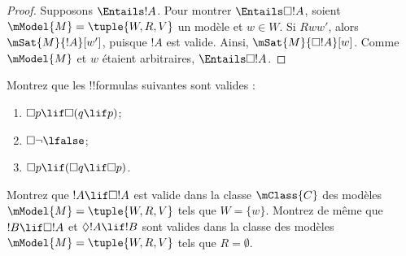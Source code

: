 \documentclass[../../../include/open-logic-section]{subfiles}
\begin{document}
\begin{proof}
  Supposons $\Entails !A$. Pour montrer $\Entails \Box!A$, soient
  $\mModel{M} = \tuple{W, R, V}$ un modèle et $w \in W$. Si $Rww'$,
  alors $\mSat{M}{!A}[w']$, puisque $!A$ est valide. Ainsi,
  $\mSat{M}{\Box!A}[w]$. Comme $\mModel{M}$ et $w$ étaient
  arbitraires, $\Entails \Box!A$.
\end{proof}

\begin{prob}
  Montrez que les !!{formula}s suivantes sont valides :
  \begin{enumerate}
  \item $\Box p \lif \Box (q \lif p)$;
  \item $\Box \lnot \lfalse$;
  \item $\Box p \lif (\Box q \lif \Box p)$.
  \end{enumerate}
\end{prob}

\begin{prob}
  Montrez que $!A \lif \Box!A$ est valide dans la classe
  $\mClass{C}$ des modèles $\mModel{M} = \tuple{W, R, V}$ tels
  que $W = \{w\}$. Montrez de même que $!B \lif \Box !A$ et
  $\Diamond !A \lif !B$ sont valides dans la classe des modèles
  $\mModel{M} = \tuple{W, R, V}$ tels que $R = \emptyset$.
\end{prob}
\end{document}
